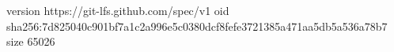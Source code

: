 version https://git-lfs.github.com/spec/v1
oid sha256:7d825040c901bf7a1c2a996e5c0380dcf8fefe3721385a471aa5db5a536a78b7
size 65026
